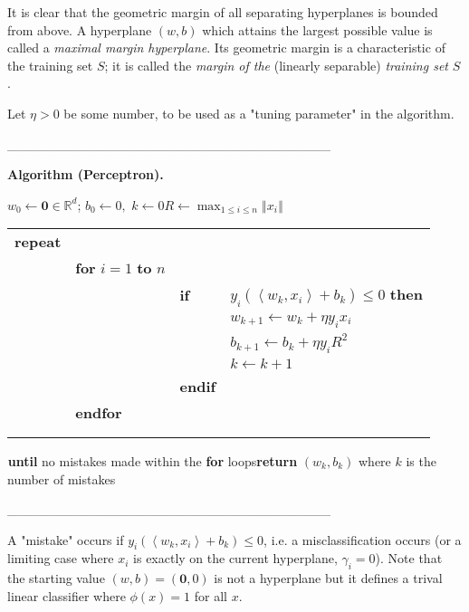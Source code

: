 \documentclass[11pt,twoside]{article}%
\theoremstyle{change}
\begin{document}
It is clear that the geometric margin of all separating hyperplanes is bounded
from above. A hyperplane $\left(  w,b\right)  $ which attains the largest
possible value is called a \textit{maximal margin hyperplane}. Its geometric
margin is a characteristic of the training set $S$; it is called the
\textit{margin of the} (linearly separable) \textit{training set} $S$.

Let $\eta>0$ be some number, to be used as a "tuning parameter" in the algorithm.

\_\_\_\_\_\_\_\_\_\_\_\_\_\_\_\_\_\_\_\_\_\_\_\_\_\_\_\_\_\_\_\_\_\_

\textbf{Algorithm (Perceptron). }

$w_{0}\leftarrow\mathbf{0}\in\mathbb{R}^{d}$; $b_{0}\leftarrow0,$
$k\leftarrow0$\newline$R\leftarrow\max_{1\leq i\leq n}\left\Vert
x_{i}\right\Vert $\newline%

\begin{tabular}
[c]{llll}%
\textbf{repeat} &  &  & \\
& \textbf{for} $i=1$ \textbf{to} $n$ &  & \\
&  & \textbf{if} & $y_{i}\left(  \left\langle w_{k},x_{i}\right\rangle
+b_{k}\right)  \leq0$ \textbf{then}\\
&  &  & $w_{k+1}\leftarrow w_{k}+\eta y_{i}x_{i}$\\
&  &  & $b_{k+1}\leftarrow b_{k}+\eta y_{i}R^{2}$\\
&  &  & $k\leftarrow k+1$\\
&  & \textbf{endif} & \\
& \textbf{endfor} &  & \\
&  &  & \\
&  &  &
\end{tabular}
$_{{}}$\newline\textbf{until} no mistakes made within the \textbf{for}
loops\newline\textbf{return} $\left(  w_{k},b_{k}\right)  $ where $k$ is the
number of mistakes

\bigskip\_\_\_\_\_\_\_\_\_\_\_\_\_\_\_\_\_\_\_\_\_\_\_\_\_\_\_\_\_\_\_\_\_\_

A "mistake" occurs if $y_{i}\left(  \left\langle w_{k},x_{i}\right\rangle
+b_{k}\right)  \leq0$, i.e. a misclassification occurs (or a limiting case
where $x_{i}$ is exactly on the current hyperplane, $\gamma_{i}=0$). Note that
the starting value $(w,b)=(\mathbf{0},0)$ is not a hyperplane but it defines a
trival linear classifier where $\phi(x)=1$ for all $x$.
\end{document}
